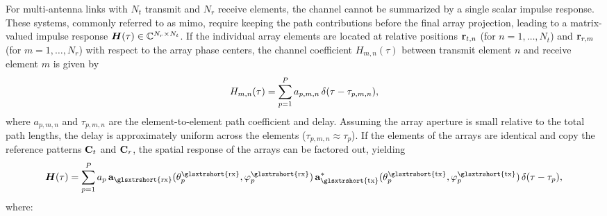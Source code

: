 For multi-antenna links with $N_t$ transmit and $N_r$ receive elements, the channel cannot be summarized by a single scalar impulse response. These systems, commonly referred to as \gls{mimo}, require keeping the path contributions before the final array projection, leading to a matrix-valued impulse response $\boldsymbol{H}(\tau) \in \mathbb{C}^{N_r \times N_t}$. If the individual array elements are located at relative positions $\mathbf{r}_{t,n}$ (for $n=1,\dots,N_t$) and $\mathbf{r}_{r,m}$ (for $m=1,\dots,N_r$) with respect to the array phase centers, the channel coefficient $H_{m,n}(\tau)$ between transmit element $n$ and receive element $m$ is given by
\begin{equation}\labeq{mimo-channel-matrix-element}
  H_{m,n}(\tau) = \sum_{p=1}^{P} a_{p,m,n} \, \delta(\tau - \tau_{p,m,n}),
\end{equation}
where $a_{p,m,n}$ and $\tau_{p,m,n}$ are the element-to-element path coefficient and delay. Assuming the array aperture is small relative to the total path lengths, the delay is approximately uniform across the elements ($\tau_{p,m,n} \approx \tau_p$). If the elements of the arrays are identical and copy the reference patterns $\mathbf{C}_t$ and $\mathbf{C}_r$, the spatial response of the arrays can be factored out, yielding
\begin{equation}\labeq{mimo-steering}
  \bsit{H}(\tau) = \sum_{p=1}^{P} a_p\,\bsup{a}_{\text{\glsxtrshort{rx}}}(\theta_p^{\text{\glsxtrshort{rx}}},\varphi_p^{\text{\glsxtrshort{rx}}})\,\bsup{a}_{\text{\glsxtrshort{tx}}}^{*}(\theta_p^{\text{\glsxtrshort{tx}}},\varphi_p^{\text{\glsxtrshort{tx}}})\,\delta(\tau-\tau_p),
\end{equation}
where:
